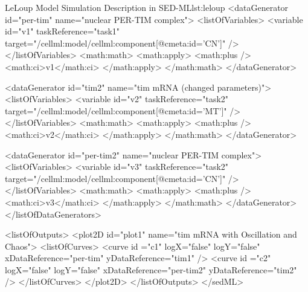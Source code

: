 \begin{myXmlLst}{LeLoup Model Simulation Description in SED-ML}{lst:leloup}
    <dataGenerator id="per-tim" name="nuclear PER-TIM complex">
      <listOfVariables>
        <variable id="v1" taskReference="task1" target="/cellml:model/cellml:component[@cmeta:id='CN']" />
      </listOfVariables>
      <math:math>
        <math:apply>
          <math:plus />
          <math:ci>v1</math:ci>
        </math:apply>
      </math:math>
    </dataGenerator>
    
    <dataGenerator id="tim2" name="tim mRNA (changed parameters)">
      <listOfVariables>
        <variable id="v2" taskReference="task2" target="/cellml:model/cellml:component[@cmeta:id='MT']" />
      </listOfVariables>  
        <math:math>
          <math:apply>
            <math:plus />
            <math:ci>v2</math:ci>
          </math:apply>
        </math:math>
    </dataGenerator>
    
    <dataGenerator id="per-tim2" name="nuclear PER-TIM complex">
      <listOfVariables>
        <variable id="v3" taskReference="task2" target="/cellml:model/cellml:component[@cmeta:id='CN']" />
      </listOfVariables>
      <math:math>
        <math:apply>
          <math:plus />
          <math:ci>v3</math:ci>
        </math:apply>
      </math:math>
    </dataGenerator>
  </listOfDataGenerators>
  
  <listOfOutputs>
    <plot2D id="plot1" name="tim mRNA with Oscillation and Chaos">
      <listOfCurves>
        <curve id ="c1" logX="false" logY="false" xDataReference="per-tim" yDataReference="tim1" />
        <curve id ="c2" logX="false" logY="false" xDataReference="per-tim2" yDataReference="tim2" />
      </listOfCurves>
    </plot2D>
  </listOfOutputs>
</sedML>
\end{myXmlLst}



